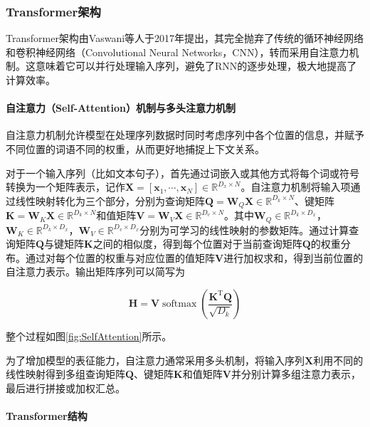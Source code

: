 \subsubsection{Transformer架构}

Transformer架构由Vaswani等人于2017年提出，其完全抛弃了传统的循环神经网络和卷积神经网络（Convolutional Neural Networks，CNN），转而采用自注意力机制。这意味着它可以并行处理输入序列，避免了RNN的逐步处理，极大地提高了计算效率。

\paragraph{自注意力（Self-Attention）机制与多头注意力机制}

自注意力机制允许模型在处理序列数据时同时考虑序列中各个位置的信息，并赋予不同位置的词语不同的权重，从而更好地捕捉上下文关系。

对于一个输入序列（比如文本句子），首先通过词嵌入或其他方式将每个词或符号转换为一个矩阵表示，记作$\boldsymbol  {X}=\left[\boldsymbol  {x}_1, \cdots, \boldsymbol  {x}_N\right] \in \mathbb{R}^{D_{x} \times N}$。自注意力机制将输入项通过线性映射转化为三个部分，分别为查询矩阵$\boldsymbol{Q}=\boldsymbol{W}_Q \boldsymbol{X} \in \mathbb{R}^{D_k \times N}$、键矩阵$\boldsymbol{K}=\boldsymbol{W}_K \boldsymbol{X} \in \mathbb{R}^{D_k \times N}$和值矩阵$\boldsymbol{V}=\boldsymbol{W}_V \boldsymbol{X} \in \mathbb{R}^{D_v \times N}$。其中$\boldsymbol  {W}_Q \in \mathbb{R}^{D_k \times D_x}$，$\boldsymbol  {W}_K \in \mathbb{R}^{D_k \times D_x}$，$\boldsymbol  {W}_V \in \mathbb{R}^{D_v \times D_x}$分别为可学习的线性映射的参数矩阵。通过计算查询矩阵$\boldsymbol{Q}$与键矩阵$\boldsymbol K$之间的相似度，得到每个位置对于当前查询矩阵$\boldsymbol{Q}$的权重分布。通过对每个位置的权重与对应位置的值矩阵$\boldsymbol{V}$进行加权求和，得到当前位置的自注意力表示。输出矩阵序列可以简写为

$$
\boldsymbol{H}=\boldsymbol{V} \operatorname{softmax}\left(\frac{\boldsymbol{K}^{\mathrm{T}} \boldsymbol{Q}}{\sqrt{D_k}}\right)
$$

整个过程如图\ref{fig:SelfAttention}所示。



为了增加模型的表征能力，自注意力通常采用多头机制，将输入序列$\boldsymbol X$利用不同的线性映射得到多组查询矩阵$\boldsymbol{Q}$、键矩阵$\boldsymbol K$和值矩阵$\boldsymbol{V}$并分别计算多组注意力表示，最后进行拼接或加权汇总。

\paragraph{Transformer结构}

